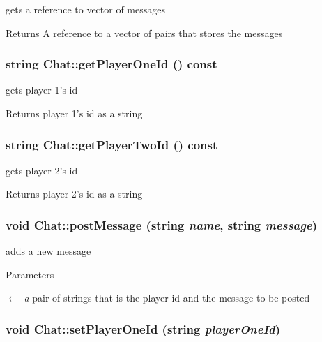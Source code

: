 gets a reference to vector of messages \begin{DoxyReturn}{Returns}
A reference to a vector of pairs that stores the messages 
\end{DoxyReturn}
\hypertarget{classChat_add2a099a2c259d0a4a7e88061a3ac7df}{
\subsubsection[{getPlayerOneId}]{\setlength{\rightskip}{0pt plus 5cm}string Chat::getPlayerOneId () const}}
\label{classChat_add2a099a2c259d0a4a7e88061a3ac7df}


gets player 1's id \begin{DoxyReturn}{Returns}
player 1's id as a string 
\end{DoxyReturn}
\hypertarget{classChat_a017261b95b8794213381c1534881968b}{
\subsubsection[{getPlayerTwoId}]{\setlength{\rightskip}{0pt plus 5cm}string Chat::getPlayerTwoId () const}}
\label{classChat_a017261b95b8794213381c1534881968b}


gets player 2's id \begin{DoxyReturn}{Returns}
player 2's id as a string 
\end{DoxyReturn}
\hypertarget{classChat_a02ce14db9d4c1c1aa7f5cb40df16eb60}{
\subsubsection[{postMessage}]{\setlength{\rightskip}{0pt plus 5cm}void Chat::postMessage (string {\em name}, \/  string {\em message})}}
\label{classChat_a02ce14db9d4c1c1aa7f5cb40df16eb60}


adds a new message 
\begin{DoxyParams}{Parameters}
\item[\mbox{$\leftarrow$} {\em a}]pair of strings that is the player id and the message to be posted \end{DoxyParams}
\hypertarget{classChat_adbe497560146ca9d5a940792b407f9fc}{
\subsubsection[{setPlayerOneId}]{\setlength{\rightskip}{0pt plus 5cm}void Chat::setPlayerOneId (string {\em playerOneId})}}
\label{classChat_adbe497560146ca9d5a940792b407f9fc}


